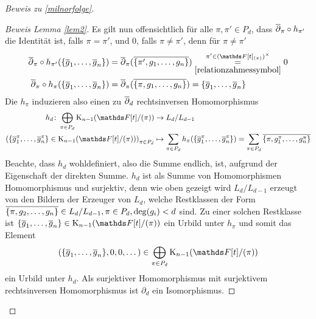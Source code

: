 \documentclass[ngerman,fontsize=11pt, paper=a4, parskip=half, titlepage=true, toc=bib]{scrartcl}
\begin{document}
\begin{proof}[Beweis zu \ref{milnorfolge}]
\begin{proof}[Beweis Lemma \ref{lem2}]

    Es gilt nun offensichtlich für alle $\pi,\pi'\in P_d$, 
    dass $\overline\partial_\pi\circ h_{\pi'}$ die Identität ist, 
    falls $\pi=\pi'$, und $0$, falls $\pi\neq\pi'$,
    denn für $\pi\neq\pi'$
    \begin{align*}
      \ov\partial_\pi\circ h_{\pi'}(\{\ov g_1,\dotsc,\ov g_n\})
      &= \ov\partial_\pi(\ov{\{\pi', g_1,\dotsc, g_n\}})
        \overset{\pi'\in(\F[t]_{(\pi)})^\times}{
        \underset{\ref{relationzahmessymbol}}{=}}
        0\\
      \ov\partial_\pi\circ h_{\pi}(\{\ov g_1,\dotsc,\ov g_n\})
      &= \ov\partial_\pi(\ov{\{\pi, g_1,\dotsc, g_n\}})
      = \{\ov g_1,\dotsc,\ov g_n\}
    \end{align*}
    Die $h_\pi$ induzieren also einen zu
    $\overline\partial_d$ rechtsinversen Homomorphismus
    \begin{align*}
      h_d\colon \bigoplus_{\pi\in P_d}\K_{n-1}(\Ftpi)
      &\to L_d/L_{d-1}\\
      \left(
      \{\ov g_1^\pi,\dotsc,\ov g_n^\pi\}\in\K_{n-1}(\Ftpi)
      \right)_{\pi\in P_d}
      &\mapsto 
        \sum_{\pi\in P_d} h_\pi(\{\ov g_1^\pi,\dotsc,\ov g_n^\pi\}) 
        = \sum_{\pi\in P_d} \ov{\{\pi, g_1^\pi,\dotsc,g_n^\pi\}}
    \end{align*}
    Beachte, dass $h_d$ wohldefiniert, also die Summe endlich, ist,
    aufgrund der Eigenschaft der direkten Summe.
    $h_d$ ist als Summe von Homomorphismen Homomorphismus und
    surjektiv, denn wie oben gezeigt wird $L_d/L_{d-1}$ erzeugt von
    den Bildern der Erzeuger von $L_d$, welche Restklassen der Form 
    $\overline{\{\pi,g_2,\dotsc,g_n\}}\in L_d/L_{d-1}, \pi\in
    P_d,\deg(g_i)<d$ sind.
    Zu einer solchen Restklasse ist $\{\ov g_1,\dotsc,\ov
    g_n\}\in\K_{n-1}(\Ftpi)$ ein Urbild unter $h_\pi$
    und somit das Element
    \begin{gather*}
      \left(
      \{\ov g_1,\dotsc,\ov g_n\},%
      0, 0,\dotsc %
      \right)%
      \in \bigoplus_{\pi\in P_d}\K_{n-1}(\Ftpi)
    \end{gather*}
    ein Urbild unter $h_d$.
    Als surjektiver Homomorphismus mit surjektivem
    rechtsinversen Homomorphismus ist $\partial_d$ ein Isomorphismus.
  \end{proof}


\end{proof}
\end{document}
